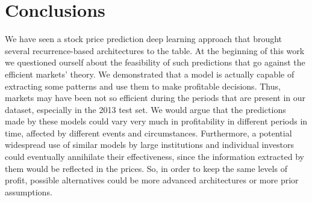 \documentclass{article}
\begin{document}
\section{Conclusions}

We have seen a stock price prediction deep learning approach that brought several
recurrence-based architectures to the table. At the beginning of this work we questioned
ourself about the feasibility of such predictions that go against the efficient markets'
theory. We demonstrated that a model is actually capable of extracting some patterns and
use them to make profitable decisions. Thus, markets may have been not so efficient during
the periods that are present in our dataset, especially in the 2013 test set. We would
argue that the predictions made by these models could vary very much in profitability
in different periods in time, affected by different events and circumstances. Furthermore,
a potential widespread use of similar models by large institutions and individual investors
could eventually annihilate their effectiveness, since the information extracted by them would
be reflected in the prices. So, in order to keep the same levels of profit, possible
alternatives could be more advanced architectures or more prior assumptions.  



\end{document}
